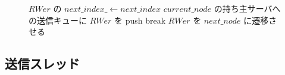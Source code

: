 \begin{figure}[!t]
\begin{algorithm}[H]
\begin{algorithmic}[1]
                                    \STATE $RWer$ の $next\_index\_ \leftarrow next\_index$
                                    \STATE $current\_node$ の持ち主サーバへの送信キューに $RWer$ を push
                                    \STATE break
                                \ELSE
                                    \STATE $RWer$ を $next\_node$ に遷移させる
                                \ENDIF
                            \ENDIF
                        \ENDIF
                    \ENDIF
                \ENDWHILE
        \ENDIF
        \ENDFOR
        \end{algorithmic}
    \end{algorithm}
\end{figure}


\subsection{送信スレッド}


